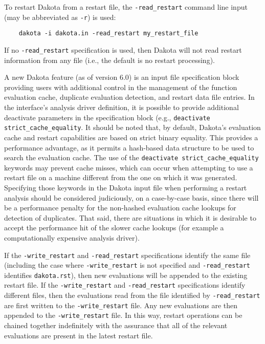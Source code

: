 To restart Dakota from a restart file, the \texttt{-read\_restart}
command line input (may be abbreviated as \texttt{-r}) is used:
\begin{small}
\begin{verbatim}
    dakota -i dakota.in -read_restart my_restart_file
\end{verbatim}
\end{small}

If no \texttt{-read\_restart} specification is used, then Dakota will
not read restart information from any file (i.e., the default is no
restart processing).

A new Dakota feature (as of version 6.0) is an input file specification block
providing users with additional control in the management of the function
evaluation cache, duplicate evaluation detection, and restart data file entries. 
In the interface’s analysis driver definition, it is possible to provide
additional deactivate parameters in the specification block
(e.g., \texttt{deactivate strict\_cache\_equality}.
It should be noted that, by default, Dakota's
evaluation cache and restart capabilities are based on strict binary equality.  
This provides a performance advantage, as it permits a hash-based data
structure to be used to search the evaluation cache.  The use of the
\texttt{deactivate strict\_cache\_equality} keywords may prevent cache misses,
which can occur when attempting to use a restart file on a machine different
from the one on which it was generated. Specifying those keywords in the Dakota
input file when performing a restart analysis should be considered
judiciously, on a case-by-case basis, since there will be a performance penalty
for the non-hashed evaluation cache lookups for detection of duplicates. That
said, there are situations in which it is desirable to accept the performance
hit of the slower cache lookups (for example a computationally expensive
analysis driver).

If the \texttt{-write\_restart} and \texttt{-read\_restart}
specifications identify the same file (including the case where
\texttt{-write\_restart} is not specified and \texttt{-read\_restart}
identifies \texttt{dakota.rst}), then new evaluations will be appended
to the existing restart file. If the \texttt{-write\_restart} and
\texttt{-read\_restart} specifications identify different files, then
the evaluations read from the file identified by
\texttt{-read\_restart} are first written to the
\texttt{-write\_restart} file. Any new evaluations are then appended
to the \texttt{-write\_restart} file. In this way, restart operations
can be chained together indefinitely with the assurance that all of
the relevant evaluations are present in the latest restart file.


